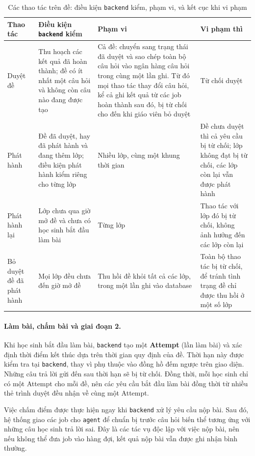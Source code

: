 \begin{table}[htb]
\centering
\caption[Các thao tác trên đề]{Các thao tác trên đề: điều kiện \texttt{backend} kiểm, phạm vi, và kết cục khi vi phạm}
\label{tab:be-thao-tac-de}
\begin{tabular}{@{}L{2.2cm}L{4.1cm}L{4.0cm}L{3.6cm}@{}}
\toprule
\textbf{Thao tác} & \textbf{Điều kiện \texttt{backend} kiểm} & \textbf{Phạm vi} & \textbf{Vi phạm thì} \\
\midrule
Duyệt đề &
Thu hoạch các kết quả đã hoàn thành; đề có ít nhất một câu hỏi và không còn câu nào đang được tạo &
Cả đề: chuyển sang trạng thái đã duyệt và sao chép toàn bộ câu hỏi vào ngân hàng câu hỏi trong cùng một lần ghi. Từ đó mọi thao tác thay đổi câu hỏi, kể cả ghi kết quả từ các job hoàn thành sau đó, bị từ chối cho đến khi giáo viên bỏ duyệt &
Từ chối duyệt \\
\addlinespace
Phát hành &
Đề đã duyệt, hay đã phát hành và đang thêm lớp; điều kiện phát hành kiểm riêng cho từng lớp &
Nhiều lớp, cùng một khung thời gian &
Đề chưa duyệt thì cả yêu cầu bị từ chối; lớp không đạt bị từ chối, các lớp còn lại vẫn được phát hành \\
\addlinespace
Phát hành lại &
Lớp chưa qua giờ mở đề và chưa có học sinh bắt đầu làm bài &
Từng lớp &
Thao tác với lớp đó bị từ chối, không ảnh hưởng đến các lớp còn lại \\
\addlinespace
Bỏ duyệt đề đã phát hành &
Mọi lớp đều chưa đến giờ mở đề &
Thu hồi đề khỏi tất cả các lớp, trong một lần ghi vào database &
Toàn bộ thao tác bị từ chối, để tránh tình trạng đề chỉ được thu hồi ở một số lớp \\
\bottomrule
\end{tabular}
\end{table}

\paragraph{Làm bài, chấm bài và giai đoạn 2.} Khi học sinh bắt đầu làm bài, 
\texttt{backend} tạo một \textbf{Attempt} (lần làm bài) và xác định thời điểm kết 
thúc dựa trên thời gian quy định của đề. Thời hạn này được kiểm tra tại \texttt{backend}, 
thay vì phụ thuộc vào đồng hồ đếm ngược trên giao diện. Những câu trả lời gửi đến sau 
thời hạn sẽ bị từ chối. Đồng thời, mỗi học sinh chỉ có một Attempt cho mỗi đề, nên các 
yêu cầu bắt đầu làm bài đồng thời từ nhiều thẻ trình duyệt đều nhận về cùng một Attempt.

Việc chấm điểm được thực hiện ngay khi \texttt{backend} xử lý yêu cầu nộp bài. 
Sau đó, hệ thống giao các job cho \texttt{agent} để chuẩn bị trước câu hỏi biến 
thể tương ứng với những câu học sinh trả lời sai. Đây là các tác vụ độc lập 
với việc nộp bài, nên nếu không thể đưa job vào hàng đợi, kết quả nộp 
bài vẫn được ghi nhận bình thường.

